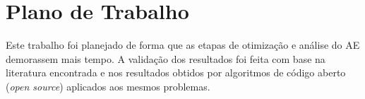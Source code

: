 





\section{Plano de Trabalho}
\label{sec:plano_trabalho}

Este trabalho foi planejado de forma que as etapas de otimização e análise do AE demorassem mais tempo. A validação dos resultados foi feita com base na literatura encontrada e nos resultados obtidos por algoritmos de código aberto (\emph{open source}) aplicados aos mesmos problemas.

